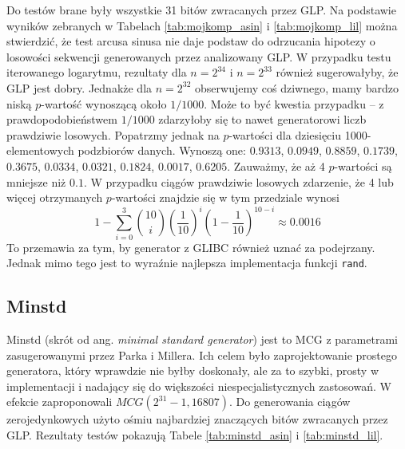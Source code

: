 \documentclass[a4paper,11pt,twoside]{book}
\theoremstyle{definition}
\begin{document}
Do testów brane były wszystkie 31 bitów zwracanych przez GLP. Na podstawie wyników zebranych w Tabelach \ref{tab:mojkomp_asin} i \ref{tab:mojkomp_lil} można stwierdzić, że test arcusa sinusa nie daje podstaw do odrzucania hipotezy o losowości sekwencji generowanych przez analizowany GLP. W przypadku testu iterowanego logarytmu, rezultaty dla $n=2^{34}$ i $n=2^{33}$ również sugerowałyby, że GLP jest dobry. Jednakże dla $n=2^{32}$ obserwujemy coś dziwnego, mamy bardzo niską $p$-wartość wynoszącą około $1/1000$. Może to być kwestia przypadku -- z prawdopodobieństwem $1/1000$ zdarzyłoby się to nawet generatorowi liczb prawdziwie losowych. Popatrzmy jednak na $p$-wartości dla dziesięciu 1000-elementowych podzbiorów danych. Wynoszą one: $0.9313$, $0.0949$, $0.8859$, $0.1739$, $0.3675$, $0.0334$, $0.0321$, $0.1824$, $0.0017$, $0.6205$. Zauważmy, że aż 4 $p$-wartości są mniejsze niż $0.1$. W przypadku ciągów prawdziwie losowych zdarzenie, że 4 lub więcej otrzymanych $p$-wartości znajdzie się w tym przedziale wynosi
\[ 1 - \sum_{i=0}^3 \binom{10}{i} \left(\frac{1}{10}\right)^{i} \left(1 - \frac{1}{10}\right)^{10-i} \approx 0.0016 \]
To przemawia za tym, by generator z GLIBC również uznać za podejrzany. Jednak mimo tego jest to wyraźnie najlepsza implementacja funkcji \texttt{rand}.

\FloatBarrier
\subsection{Minstd}
Minstd (skrót od ang. \textit{minimal standard generator}) jest to MCG z parametrami zasugerowanymi przez Parka i Millera. Ich celem było zaprojektowanie prostego generatora, który wprawdzie nie byłby doskonały, ale za to szybki, prosty w implementacji i nadający się do większości niespecjalistycznych zastosowań. W efekcie zaproponowali $MCG(2^{31}-1, 16807)$. Do generowania ciągów zerojedynkowych użyto ośmiu najbardziej znaczących bitów zwracanych przez GLP. Rezultaty testów pokazują Tabele \ref{tab:minstd_asin} i \ref{tab:minstd_lil}.
\end{document}
